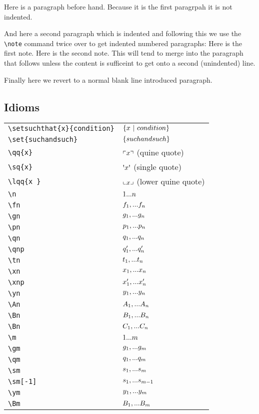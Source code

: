 \documentclass[10pt,a4paper]{article}
\begin{document}
Here is a paragraph before hand. Because it is the first paragrpah it is not indented.

And here a second paragraph which is indented and following this we use the \verb'\note' command twice over to get indented numbered paragraphs:
\note Here is the first note.
\note Here is the second note. This will tend to merge into the paragraph that follows unless the content is sufficeint to get onto a second (unindented) line.

Finally here we revert to a normal blank line introduced paragraph.

\subsection{Idioms}

\begin{tabular}{|l|p{4cm}|}
\hline
\verb!\setsuchthat{x}{condition}! & $\setsuchthat{x}{condition}$\\
\verb!\set{suchandsuch}!&$\set{suchandsuch}$\\
\verb!\qq{x} ! & $\qq{x}$ (quine quote)\\
\verb!\sq{x} ! & $\sq{x}$ (single quote)\\
\verb!\lqq{x }! & $\lqq{x}$ (lower quine quote)\\
\verb!\n  !&$   \n $\\
\verb!\fn !&$   \fn$\\
\verb!\gn !&$   \gn$\\
\verb!\pn !&$   \pn$\\
\verb!\qn !&$   \qn$\\
\verb!\qnp !&$  \qnprime$\\
\verb!\tn !&$   \tn$\\
\verb!\xn !&$   \xn$\\
\verb!\xnp !&$  \xnp$\\
\verb!\yn !&$   \yn$\\
\verb!\An !&$   \An$\\
\verb!\Bn !&$   \Bn$\\
\verb!\Bn !&$   \Cn$\\
\verb!\m  !&$   \m $\\
\verb!\gm !&$   \gm$\\
\verb!\qm !&$   \qm$\\
\verb!\sm !&$   \sm$\\
\verb!\sm[-1] !&$\sm[-1]$\\
\verb!\ym !&$   \ym$\\
\verb!\Bm !&$   \Bm$\\

\end{tabular}
\end{document}
